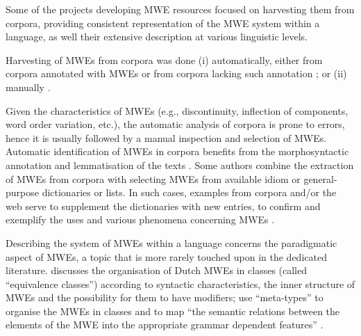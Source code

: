 \documentclass[output=paper,colorlinks,citecolor=brown]{langscibook}
\begin{document}

Some of the projects developing MWE resources focused on harvesting them from corpora, providing consistent representation of the MWE system within a language, as well their extensive description at various linguistic levels.


Harvesting of MWEs from corpora was done (i) automatically, either from corpora annotated with MWEs \citep{gregoire-2007} or from corpora lacking such annotation \citep{fellbaum2005,Odijk2013}; or (ii) manually \citep{dyvik2019,shudo_etal_2011,chapters/07}.%

Given the characteristics of MWEs (e.g., discontinuity, inflection of components, word order variation, etc.), the automatic analysis of corpora is prone to errors, hence it is usually followed by a manual inspection and selection of MWEs. Automatic identification of MWEs in corpora benefits from the morphosyntactic annotation and lemmatisation of the texts \citep{Odijk2013}. %
Some authors combine the extraction of MWEs from corpora with selecting MWEs from available idiom or general-purpose dictionaries or lists. In such cases, examples from corpora and/or the web serve to supplement the dictionaries with new entries, to confirm and exemplify the uses and various phenomena concerning MWEs \citep{hnatkova-etal-2019,markantonatou-etal-2019-idion,markantonatou-etal-in-prep,chapters/01}. %


Describing the system of MWEs within a language concerns the paradigmatic aspect of MWEs, a topic that is more rarely touched upon in the dedicated literature. \citet{gregoire-2007} discusses the organisation of Dutch MWEs in classes (called ``equivalence classes'') according to syntactic characteristics, the inner structure of MWEs and the possibility for them to have modifiers; \citet{villavicencio-LexicalEncoding} use ``meta-types'' to organise the MWEs in classes and to map ``the semantic relations between the elements of the MWE into the appropriate grammar dependent features'' \citep{villavicencio-LexicalEncoding}. 
\end{document}
